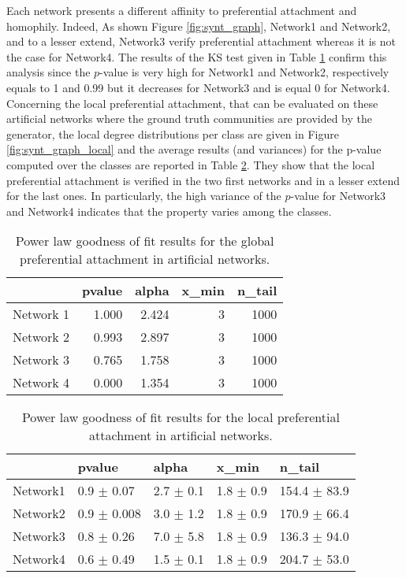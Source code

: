 \documentclass[a4paper, 12pt]{article}
\begin{document}
Each network presents a different affinity to preferential attachment and homophily.
Indeed, As shown Figure \ref{fig:synt_graph}, Network1 and Network2, and to a lesser extend, Network3 verify preferential attachment whereas it is not the case for Network4. The results of the KS test given in Table \ref{table:synt_graph} confirm this analysis since the $p$-value is very high for Network1 and Network2, respectively equals to 1 and 0.99 but it decreases for Network3 and is equal 0 for Network4.
Concerning the local preferential attachment, that can be evaluated on these artificial networks where the ground truth communities are provided by the generator, the local degree distributions per class are given in Figure \ref{fig:synt_graph_local} and the average results (and variances) for the p-value computed over the classes are reported in Table \ref{table:synt_graph_local}. They show that the local preferential attachment is verified in the two first networks and in a lesser extend for the  last ones. In particularly, the high variance of the $p$-value for Network3 and Network4 indicates that the property varies among the classes.




\begin{table}[h]
\caption{Power law goodness of fit results for the global preferential attachment in artificial networks.}
\centering
  \begin{tabular}{lrrrr}
  	\hline
  	&   pvalue &   alpha &   x\_min &   n\_tail \\
  	\hline
  	Network 1 &    1.000 &   2.424 &       3 &     1000 \\
  	Network 2 &    0.993 &   2.897 &       3 &     1000 \\
  	Network 3 &    0.765 &   1.758 &       3 &     1000 \\
  	Network 4 &    0.000 &   1.354 &       3 &     1000 \\
  	\hline
  \end{tabular}
\label{table:synt_graph}
\end{table}

\begin{table}[h]
\caption{Power law goodness of fit results for the local preferential attachment in artificial networks.}
\centering
    \begin{tabular}{lllll}
    \hline
    & pvalue          & alpha           & x\_min        & n\_tail           \\
    \hline
    Network1 & 0.9 $\pm$ 0.07  & 2.7 $\pm$ 0.1 & 1.8 $\pm$ 0.9 & 154.4 $\pm$ 83.9 \\
    Network2 & 0.9 $\pm$ 0.008 & 3.0 $\pm$ 1.2  & 1.8 $\pm$ 0.9 & 170.9 $\pm$ 66.4  \\
    Network3 & 0.8 $\pm$ 0.26 & 7.0 $\pm$ 5.8 & 1.8 $\pm$ 0.9 & 136.3 $\pm$ 94.0 \\
    Network4 & 0.6 $\pm$ 0.49    & 1.5 $\pm$ 0.1 & 1.8 $\pm$ 0.9 & 204.7 $\pm$ 53.0 \\
    \hline
    \end{tabular}
\label{table:synt_graph_local}
\end{table}
\end{document}
